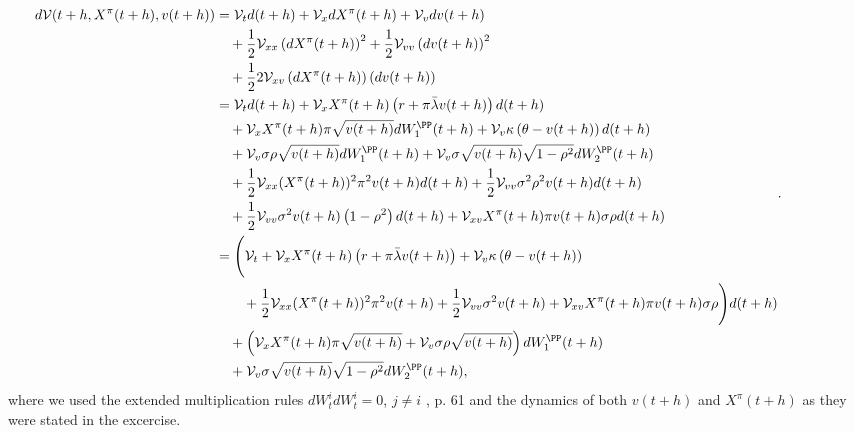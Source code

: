 \documentclass[11pt]{article}
\numberwithin{equation}{section}
\begin{document}
\begin{equation*}
    \hspace*{-1.5cm}
    \begin{aligned}
        d\mathcal{V}(t + h, X^\pi(t + h), v(t + h)) &= \mathcal{V}_t d(t + h) + \mathcal{V}_x dX^\pi(t + h) + \mathcal{V}_v dv(t + h) \\
        &\quad + \frac{1}{2} \mathcal{V}_{xx} \left(dX^\pi(t + h)\right)^2 + \frac{1}{2} \mathcal{V}_{vv} \left(dv(t + h)\right)^2 \\
        &\quad + \frac{1}{2} 2\mathcal{V}_{xv} \left(dX^\pi(t + h)\right)\left(dv(t + h)\right) \\
        &= \mathcal{V}_t d(t + h) + \mathcal{V}_x X^\pi(t + h) \left( r + \pi \bar{\lambda} v(t + h) \right) d(t + h) \\
        &\quad + \mathcal{V}_x X^\pi(t + h) \pi \sqrt{v(t + h)} dW^\PP_1(t + h) + \mathcal{V}_v \kappa \left( \theta - v(t + h) \right) d(t + h) \\
        &\quad + \mathcal{V}_v \sigma \rho \sqrt{v(t + h)} dW^\PP_1(t + h) + \mathcal{V}_v \sigma \sqrt{v(t + h)} \sqrt{1 - \rho^2} dW^\PP_2(t + h) \\
        &\quad + \frac{1}{2} \mathcal{V}_{xx} (X^\pi(t + h))^2 \pi^2 v(t + h) d(t + h) + \frac{1}{2} \mathcal{V}_{vv} \sigma^2 \rho^2 v(t + h) d(t + h) \\
        &\quad + \frac{1}{2} \mathcal{V}_{vv} \sigma^2 v(t + h) \left(1 - \rho^2\right) d(t + h) + \mathcal{V}_{xv} X^\pi(t + h) \pi v(t + h) \sigma \rho d(t + h) \\
        &= \Biggl(\mathcal{V}_t + \mathcal{V}_x X^\pi(t + h) \left( r + \pi \bar{\lambda} v(t + h) \right) + \mathcal{V}_v \kappa \left( \theta - v(t + h) \right) \\
        &\quad\quad  + \frac{1}{2} \mathcal{V}_{xx} (X^\pi(t + h))^2 \pi^2 v(t + h) + \frac{1}{2} \mathcal{V}_{vv} \sigma^2 v(t + h) + \mathcal{V}_{xv} X^\pi(t + h) \pi v(t + h) \sigma \rho  \Biggr) d(t + h) \\
        &\quad + \left( \mathcal{V}_x X^\pi(t + h) \pi \sqrt{v(t + h)} + \mathcal{V}_v \sigma \rho \sqrt{v(t + h)} \right) dW^\PP_1(t + h) \\
        &\quad + \mathcal{V}_v \sigma \sqrt{v(t + h)} \sqrt{1 - \rho^2} dW^\PP_2(t + h),
        \end{aligned}.
\end{equation*}
where we used the extended multiplication rules $dW_t^i dW_t^i=0$, $j\neq i$
\cite{bjork2020}, p. 61
and the dynamics of both $v(t+h)$ and $X^\pi(t+h)$ as they were stated in the excercise.
\end{document}
